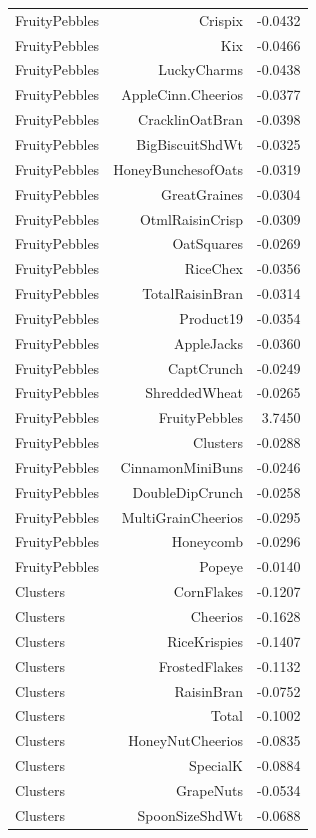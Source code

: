 \begin{longtable}{@{}lrr@{}}
FruityPebbles & Crispix & -0.0432 \\
FruityPebbles & Kix & -0.0466 \\
FruityPebbles & LuckyCharms & -0.0438 \\
FruityPebbles & AppleCinn.Cheerios & -0.0377 \\
FruityPebbles & CracklinOatBran & -0.0398 \\
FruityPebbles & BigBiscuitShdWt & -0.0325 \\
FruityPebbles & HoneyBunchesofOats & -0.0319 \\
FruityPebbles & GreatGraines & -0.0304 \\
FruityPebbles & OtmlRaisinCrisp & -0.0309 \\
FruityPebbles & OatSquares & -0.0269 \\
FruityPebbles & RiceChex & -0.0356 \\
FruityPebbles & TotalRaisinBran & -0.0314 \\
FruityPebbles & Product19 & -0.0354 \\
FruityPebbles & AppleJacks & -0.0360 \\
FruityPebbles & CaptCrunch & -0.0249 \\
FruityPebbles & ShreddedWheat & -0.0265 \\
FruityPebbles & FruityPebbles & 3.7450 \\
FruityPebbles & Clusters & -0.0288 \\
FruityPebbles & CinnamonMiniBuns & -0.0246 \\
FruityPebbles & DoubleDipCrunch & -0.0258 \\
FruityPebbles & MultiGrainCheerios & -0.0295 \\
FruityPebbles & Honeycomb & -0.0296 \\
FruityPebbles & Popeye & -0.0140 \\
Clusters & CornFlakes & -0.1207 \\
Clusters & Cheerios & -0.1628 \\
Clusters & RiceKrispies & -0.1407 \\
Clusters & FrostedFlakes & -0.1132 \\
Clusters & RaisinBran & -0.0752 \\
Clusters & Total & -0.1002 \\
Clusters & HoneyNutCheerios & -0.0835 \\
Clusters & SpecialK & -0.0884 \\
Clusters & GrapeNuts & -0.0534 \\
Clusters & SpoonSizeShdWt & -0.0688 \\

\end{longtable}
